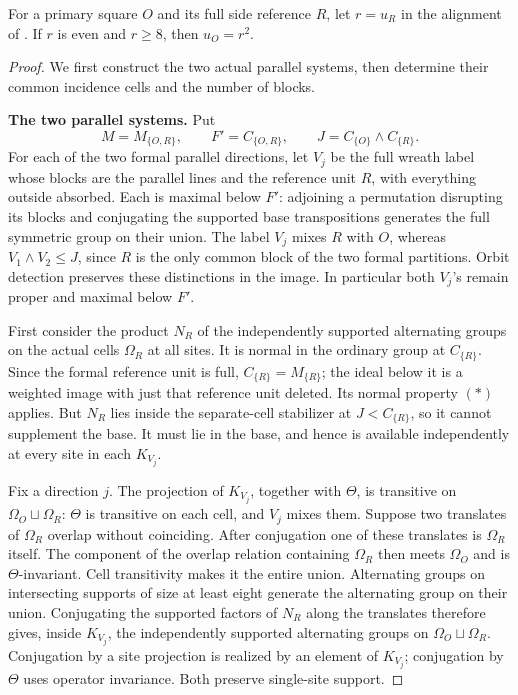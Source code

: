 \begin{theorem}\label{t:weighted-square}
For a primary square \(O\) and its full side reference \(R\), let
\(r=u_R\) in the alignment of .  If \(r\) is even
and \(r\ge8\), then \(u_O=r^2\).
\end{theorem}
\begin{proof}
We first construct the two actual parallel systems, then determine their
common incidence cells and the number of blocks.

\noindent\textbf{The two parallel systems.}
Put
\[
 M=M_{\{O,R\}},\qquad F'=C_{\{O,R\}},\qquad
 J=C_{\{O\}}\wedge C_{\{R\}}.
\]
For each of the two formal parallel directions, let \(V_j\) be
the full wreath label whose blocks are the parallel lines and the
reference unit \(R\), with everything outside absorbed.  Each is
maximal below \(F'\): adjoining a permutation disrupting its blocks
and conjugating the supported base transpositions generates the full
symmetric group on their union.  The label \(V_j\) mixes \(R\)
with \(O\), whereas \(V_1\wedge V_2\le J\), since \(R\) is
the only common block of the two formal partitions.  Orbit detection
preserves these distinctions in the image.  In particular both
\(V_j\)'s remain proper and maximal below \(F'\).

First consider the product \(N_R\) of the independently supported
alternating groups on the actual cells \(\Omega_R\) at all sites.
It is normal in the ordinary group at \(C_{\{R\}}\).  Since the
formal reference unit is full, \(C_{\{R\}}=M_{\{R\}}\); the ideal
below it is a weighted image with just that reference unit deleted.
Its normal property \((*)\) applies.  But \(N_R\) lies inside the
separate-cell stabilizer at \(J<C_{\{R\}}\), so it cannot supplement
the base.  It must lie in the base, and hence is available independently
at every site in each \(K_{V_j}\).

Fix a direction \(j\).  The projection of \(K_{V_j}\), together
with \(\Theta\), is transitive on \(\Omega_O\sqcup\Omega_R\):
\(\Theta\) is transitive on each cell, and \(V_j\) mixes them.
Suppose two translates of \(\Omega_R\) overlap without coinciding.
After conjugation one of these translates is \(\Omega_R\) itself.
The component of the overlap relation containing \(\Omega_R\)
then meets \(\Omega_O\) and is \(\Theta\)-invariant.  Cell
transitivity makes it the entire union.  Alternating groups on
intersecting supports of size at least eight generate the alternating
group on their union.  Conjugating the supported factors of \(N_R\)
along the translates therefore gives, inside \(K_{V_j}\), the
independently supported alternating groups on
\(\Omega_O\sqcup\Omega_R\).  Conjugation by a site projection is
realized by an element of \(K_{V_j}\); conjugation by \(\Theta\)
uses operator invariance.  Both preserve single-site support.


\end{proof}
